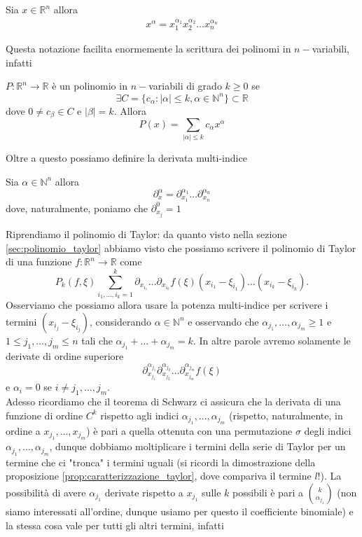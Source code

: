 \begin{definition}
	Sia $x \in \mathbb{R}^n$ allora
	\begin{align*}
		x^{\alpha} = x_1^{\alpha_1} x_2^{\alpha_2} \ldots x_n^{\alpha_n}
	\end{align*}
\end{definition}
Questa notazione facilita enormemente la scrittura dei polinomi in $n-$variabili, infatti
\begin{definition}
	$P: \mathbb{R}^n \to \mathbb{R}$ è un polinomio in $n-$variabili di grado $k \geq 0$ se
	$$
	\exists C = \{c_\alpha : |\alpha| \leq k, \alpha \in \mathbb{N}^n \} \subset \mathbb{R} 
	$$
	dove $0 \neq c_\beta \in C$ e $|\beta| = k$. Allora
	$$
	P(x) = \sum_{|\alpha| \leq k} c_\alpha x^{\alpha}
	$$
\end{definition}
Oltre a questo possiamo definire la derivata multi-indice
\begin{definition}
	Sia $\alpha \in \mathbb{N}^n$ allora 
	$$
	\partial^{\alpha}_x = \partial_{x_1}^{\alpha_1} \ldots \partial_{x_n}^{\alpha_n}
	$$
	dove, naturalmente, poniamo che $\partial_{x_j}^0 = 1$
\end{definition}
Riprendiamo il polinomio di Taylor: da quanto visto nella sezione \ref{sec:polinomio_taylor} abbiamo visto che possiamo scrivere il polinomio di Taylor di una funzione $f: \mathbb{R}^n \to \mathbb{R}$ come
$$
P_k(f, \xi)\sum_{i_1, \ldots, i_k=1}^k \partial_{x_{i_1}} \ldots \partial_{x_{i_k}} f(\xi) (x_{i_1} - \xi_{i_1}) \ldots (x_{i_k} - \xi_{i_k}).
$$
Osserviamo che possiamo allora usare la potenza multi-indice per scrivere i termini $(x_{i_j} - \xi_{i_j})$, considerando $\alpha \in \mathbb{N}^n$ e osservando che $\alpha_{j_1}, \ldots, \alpha_{j_m} \geq 1$ e $1 \leq j_1, \ldots, j_m \leq n$ tali che $\alpha_{j_1} + \ldots + \alpha_{j_m} = k$. In altre parole avremo solamente le derivate di ordine superiore
$$
\partial_{x_{j_1}}^{\alpha_{j_1}} \partial_{x_{j_2}}^{\alpha_{j_2}} \ldots \partial_{x_{j_m}}^{\alpha_{j_m}} f(\xi)
$$
e $\alpha_i = 0$ se $i \neq j_1, \ldots, j_m$. \\
Adesso ricordiamo che il teorema di Schwarz ci assicura che la derivata di una funzione di ordine $C^k$ rispetto agli indici $\alpha_{j_1}, \ldots, \alpha_{j_m}$ (rispetto, naturalmente, in ordine a $x_{j_1}, \ldots, x_{j_m}$) è pari a quella ottenuta con una permutazione $\sigma$ degli indici $\alpha_{j_1}, \ldots, \alpha_{j_m}$, dunque dobbiamo moltiplicare i termini della serie di Taylor per un termine che ci "tronca" i termini uguali (si ricordi la dimostrazione della proposizione \ref{prop:caratterizzazione_taylor}, dove compariva il termine $l!$). La possibilità di avere $\alpha_{j_1}$ derivate rispetto a $x_{j_1}$ sulle $k$ possibili è pari a $\binom{k}{\alpha_{j_1}}$ (non siamo interessati all'ordine, dunque usiamo per questo il coefficiente binomiale) e la stessa cosa vale per tutti gli altri termini, infatti
